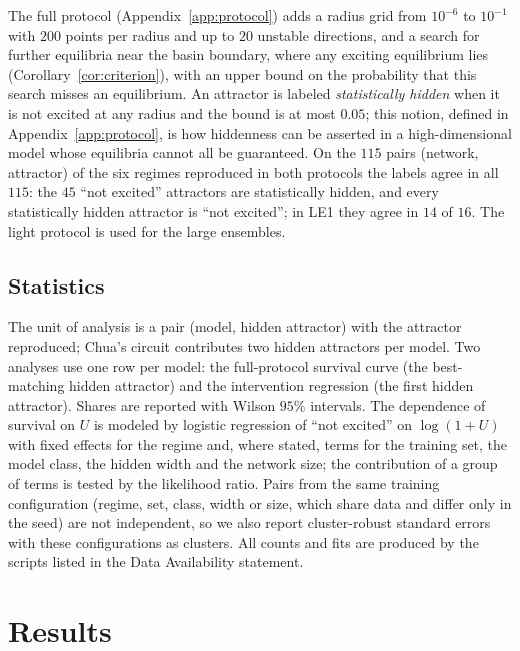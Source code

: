 \documentclass[aip,cha,reprint,amsmath,amssymb,longbibliography]{revtex4-2}
\theoremstyle{definition}
\begin{document}
The full protocol (Appendix~\ref{app:protocol}) adds a radius grid from $10^{-6}$ to $10^{-1}$ with $200$ points per radius
and up to $20$ unstable directions, and a search for further equilibria near the basin boundary, where any exciting
equilibrium lies (Corollary~\ref{cor:criterion}), with an upper bound on the probability that this search misses an
equilibrium.\cite{Good1953,McAllesterOrtiz2003,BerendKontorovich2013,BenHamou2017MissingMass} An attractor is labeled
\emph{statistically hidden} when it is not excited at any radius and the bound is at most $0.05$; this notion, defined in
Appendix~\ref{app:protocol}, is how hiddenness can be asserted in a high-dimensional model whose equilibria cannot all be
guaranteed. On the $115$ pairs (network, attractor) of the six regimes reproduced in both protocols the labels agree in all
$115$: the $45$ ``not excited'' attractors are statistically hidden, and every statistically hidden attractor is ``not
excited''; in LE1 they agree in $14$ of $16$. The
light protocol is used for the large ensembles.

\subsection{Statistics}
\label{sec:stats}

The unit of analysis is a pair (model, hidden attractor) with the attractor reproduced; Chua's circuit contributes two
hidden attractors per model. Two analyses use one row per model: the full-protocol survival curve (the best-matching hidden
attractor) and the intervention regression (the first hidden attractor). Shares are reported with Wilson $95\%$
intervals. The dependence of survival on $U$ is modeled by logistic regression of ``not excited'' on $\log(1+U)$ with fixed
effects for the regime and, where stated, terms for the training set, the model class, the hidden width and the network
size;\cite{Agresti2013Categorical,McCullaghNelder1989GLM} the contribution of a group of terms is tested by the likelihood
ratio. Pairs from the same training configuration (regime, set, class, width or size, which share data and differ only in
the seed) are not independent, so we also report cluster-robust standard errors with these configurations as clusters. All
counts and fits are produced by the scripts listed in the Data Availability statement.

\section{Results}
\label{sec:results}
\end{document}
